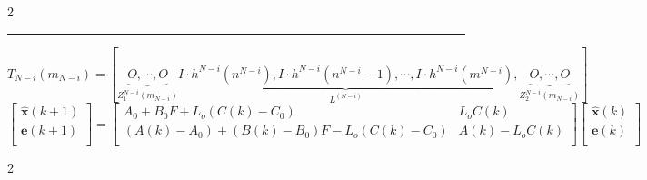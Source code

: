 \documentclass{aas}
\begin{document}
{\begin{multicols}{2}
\end{multicols}%
\vskip1mm
\hrule
\begin{equation}
T_{N-i}(m_{N-i})= \left[ \underbrace{O,\cdots,
O}_{Z_1^{N-i}(m_{N-i})} \underbrace{I \cdot h^{N-i}(n^{N-i}), I
\cdot h^{N-i}(n^{N-i}-1),\cdots, I \cdot
h^{N-i}(m^{N-i})}_{L^{(N-i)}},\underbrace{O,\cdots,
O}_{Z_2^{N-i}(m_{N-i})} \right]\tag{3}
\end{equation}
\begin{equation} \left[
  \begin{array}{c}
    \hat{{\pmb x}}(k+1) \\
    {\pmb e}(k+1)\\
  \end{array}
\right]=\left[
  \begin{array}{cc}
    A_0+B_0F+L_o(C(k)-C_0) & L_oC(k) \\
    (A(k)-A_0)+(B(k)-B_0)F-L_o(C(k)-C_0) & A(k)-L_oC(k) \\
  \end{array}
\right]\left[
  \begin{array}{c}
    \hat{{\pmb x}}(k) \\
    {\pmb e} (k)\\
  \end{array}
\right]\tag{4}
\end{equation}
\begin{multicols}{2}%

\end{multicols}%

}
\end{document}
